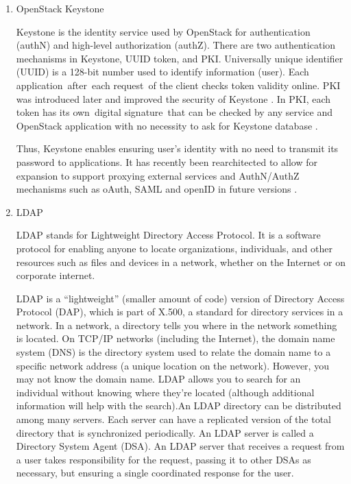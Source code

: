 \begin{enumerate}
\item {} 
OpenStack Keystone

\label{\detokenize{i524/technologies:id674}}{\hyperref[\detokenize{i524/technologies:www-keystone-wiki}]{\sphinxcrossref{{[}585{]}}}} Keystone is the identity service used
by OpenStack for authentication (authN) and high-level
authorization (authZ).  There are two authentication mechanisms
in Keystone, UUID token, and PKI.  Universally unique identifier
(UUID) is a 128-bit number used to identify information
(user). Each application after each request of the client checks
token validity online. PKI was introduced later and improved the
security of Keystone \label{\detokenize{i524/technologies:id675}}{\hyperref[\detokenize{i524/technologies:cui2015security}]{\sphinxcrossref{{[}586{]}}}}. In PKI, each token
has its own digital signature that can be checked by any service
and OpenStack application with no necessity to ask for Keystone
database \label{\detokenize{i524/technologies:id676}}{\hyperref[\detokenize{i524/technologies:www-cloudberrylab-kstn}]{\sphinxcrossref{{[}587{]}}}}.

Thus, Keystone enables ensuring user’s identity with no need to
transmit its password to applications. It has recently been
rearchitected to allow for expansion to support proxying external
services and AuthN/AuthZ mechanisms such as oAuth, SAML and
openID in future versions \label{\detokenize{i524/technologies:id677}}{\hyperref[\detokenize{i524/technologies:www-keystone}]{\sphinxcrossref{{[}588{]}}}}.

\item {} 
LDAP

LDAP stands for Lightweight Directory Access Protocol. It is a software
protocol for enabling anyone to locate organizations, individuals, and
other resources such as files and devices in a network, whether on the
Internet or on corporate internet.
\label{\detokenize{i524/technologies:id678}}{\hyperref[\detokenize{i524/technologies:www-ldap}]{\sphinxcrossref{{[}589{]}}}}

LDAP is a ``lightweight'' (smaller amount of code) version of
Directory Access Protocol (DAP), which is part of X.500, a
standard for directory services in a network.  In a network, a
directory tells you where in the network something is located. On
TCP/IP networks (including the Internet), the domain name system
(DNS) is the directory system used to relate the domain name to a
specific network address (a unique location on the
network). However, you may not know the domain name. LDAP allows
you to search for an individual without knowing where they're
located (although additional information will help with the
search).An LDAP directory can be distributed among many
servers. Each server can have a replicated version of the total
directory that is synchronized periodically.  An LDAP server is
called a Directory System Agent (DSA). An LDAP server that
receives a request from a user takes responsibility for the
request, passing it to other DSAs as necessary, but ensuring a
single coordinated response for the user.


\end{enumerate}

